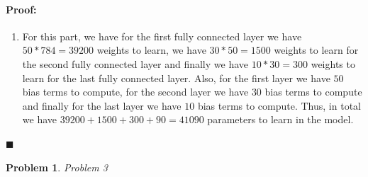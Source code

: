 \documentclass[12pt]{article}
\newenvironment{proof}{\paragraph{Proof: }}{\hfill$\blacksquare$}
\newtheorem{problem}{Problem}%
\begin{document}
\begin{proof}
\begin{enumerate}
\item For this part, we have for the first fully connected layer we have $50*784 = 39200$ weights to learn, we have $30*50 = 1500$ weights to learn for the second fully connected layer and finally we have $10*30 = 300$ weights to learn for the last fully connected layer. Also, for the first layer we have $50$ bias terms to compute, for the second layer we have $30$ bias terms to compute and finally for the last layer we have $10$ bias terms to compute. Thus, in total we have $39200 + 1500 + 300 + 90 = 41090$ parameters to learn in the model. 
\end{enumerate}

\end{proof}


\begin{problem}
\normalfont
Problem 3
\end{problem}
\end{document}
